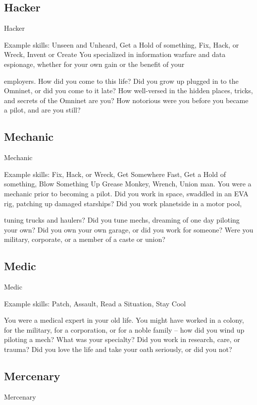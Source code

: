 \subsection{Hacker}
                                                     Hacker  

Example skills: Unseen and Unheard, Get a Hold of something, Fix, Hack, or Wreck, Invent or  
Create  
You specialized in information warfare and data espionage, whether for your own gain or the benefit of your  

employers. How did you come to this life? Did you grow up plugged in to the Omninet, or did you come to  
it late? How well-versed in the hidden places, tricks, and secrets of the Omninet are you? How notorious  
were you before you became a pilot, and are you still?
 
\subsection{Mechanic}
                                                   Mechanic  

Example skills: Fix, Hack, or Wreck, Get Somewhere Fast, Get a Hold of something, Blow  
Something Up  
Grease Monkey, Wrench, Union man. You were a mechanic prior to becoming a pilot. Did you work in  
space, swaddled in an EVA rig, patching up damaged starships? Did you work planetside in a motor pool,  

tuning trucks and haulers? Did you tune mechs, dreaming of one day piloting your own? Did you own your  
own garage, or did you work for someone? Were you military, corporate, or a member of a caste or union?    
\subsection{Medic}
                                                      Medic  

Example skills: Patch, Assault, Read a Situation, Stay Cool  

                                                                                                                  


You were a medical expert in your old life. You might have worked in a colony, for the military, for a  
corporation, or for a noble family -- how did you wind up piloting a mech? What was your specialty? Did  
you work in research, care, or trauma? Did you love the life and take your oath seriously, or did you not?  
\subsection{Mercenary}
                                                    Mercenary  

